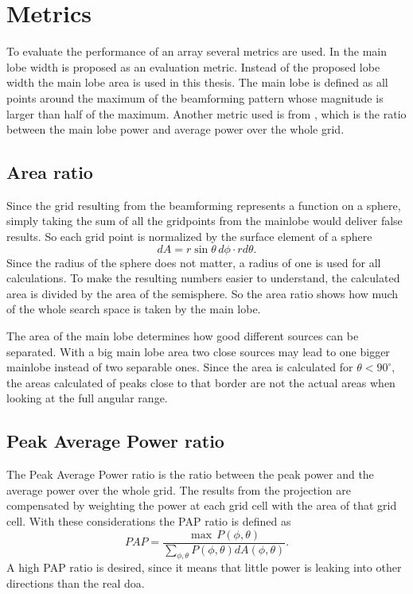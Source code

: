 \section{Metrics}
\label{sec:metrics}
To evaluate the performance of an array several metrics are used.
In \cite{Amaral} the main lobe width is proposed as an evaluation metric.
Instead of the proposed lobe width the main lobe area is 
used in this thesis.
The main lobe is defined as all points around the maximum of the 
beamforming pattern whose magnitude is larger than half of the maximum.
Another metric used is from \cite{GuiAhmad}, which is the ratio
between the main lobe power and average power over the whole grid.

\subsection{Area ratio}
Since the grid resulting from the beamforming represents a function on a sphere,
simply taking the sum of all the gridpoints from the mainlobe
would deliver false results.
So each grid point is normalized by the surface element of a sphere
\begin{equation}
	dA = r \sin\theta \, d\phi \cdot r d\theta.
\end{equation}
Since the radius of the sphere does not matter, a radius of one is used for all
calculations.
To make the resulting numbers easier to understand, the calculated area is divided
by the area of the semisphere.
So the area ratio shows how much of the whole search space is taken by the main lobe.

The area of the main lobe determines how good different sources can be separated.
With a big main lobe area two close sources may lead to one bigger mainlobe instead
of two separable ones.
Since the area is calculated for $\theta < 90^\circ$, the areas calculated
of peaks close to that border are not the actual areas when looking at the
full angular range.


\subsection{Peak Average Power ratio}
The Peak Average Power ratio is the ratio between the peak power and
the average power over the whole grid.
The results from the projection are compensated by weighting
the power at each grid cell with the area of that grid cell.
With these considerations the PAP ratio is defined as
\begin{equation}
	PAP = \frac{\max \, P(\phi, \theta)}{\sum_{\phi, \theta}^{} P(\phi, \theta) dA(\phi, \theta)}.
\end{equation}
A high PAP ratio is desired, since it means that little power is leaking
into other directions than the real \acrshort{doa}.
